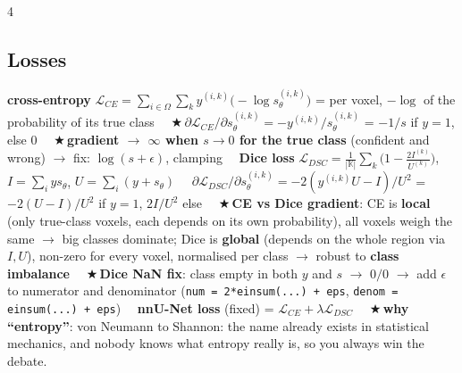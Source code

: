 \documentclass[a4paper]{article}
\newcommand{\K}[1]{\textcolor{kg}{\textbf{#1}}}
\newcommand{\F}[1]{\textcolor{fb}{#1}}
\newcommand{\E}[1]{\textcolor{ep}{#1}}
\newcommand{\T}[1]{\textcolor{tr}{\textbf{#1}}}
\newcommand{\X}{\textcolor{tr}{$\bigstar$}\,}
\newcommand{\D}{\unskip\ \textbf{\textbullet}\ \ignorespaces}
\newcommand{\ra}{\ensuremath{\to}}
\newcommand{\Om}{\Omega}
\begin{document}
\begin{multicols*}{4}
\subsection{Losses}
\K{cross-entropy} \F{$\mathcal L_{CE}=\sum_{i\in\Om}\sum_k y^{(i,k)}\big(-\log s_\theta^{(i,k)}\big)$} = per voxel, $-\log$ of the probability of its true class \D \X\F{$\partial\mathcal L_{CE}/\partial s_\theta^{(i,k)}=-y^{(i,k)}/s_\theta^{(i,k)}$} = $-1/s$ if $y{=}1$, else 0 \D \X\T{gradient \ra{} $\infty$ when $s\to0$ for the true class} (confident and wrong) \ra{} fix: $\log(s+\epsilon)$, clamping \D \K{Dice loss} \F{$\mathcal L_{DSC}=\frac1{|\mathbb K|}\sum_k\big(1-\frac{2I^{(k)}}{U^{(k)}}\big)$}, \F{$I=\sum_i ys_\theta$}, \F{$U=\sum_i(y+s_\theta)$} \D \F{$\partial\mathcal L_{DSC}/\partial s_\theta^{(i,k)}=-2(y^{(i,k)}U-I)/U^2$} = \F{$-2(U-I)/U^2$} if $y{=}1$, \F{$2I/U^2$} else \D \X\K{CE vs Dice gradient}: CE is \K{local} (only true-class voxels, each depends on its own probability), all voxels weigh the same \ra{} big classes dominate; Dice is \K{global} (depends on the whole region via $I,U$), non-zero for every voxel, normalised per class \ra{} robust to \K{class imbalance} \D \X\K{Dice NaN fix}: class empty in both $y$ and $s$ \ra{} $0/0$ \ra{} add $\epsilon$ to numerator and denominator (\E{\texttt{num = 2*einsum(...) + eps}, \texttt{denom = einsum(...) + eps}}) \D \K{nnU-Net loss} (fixed) = \F{$\mathcal L_{CE}+\lambda\mathcal L_{DSC}$} \D \X\K{why ``entropy''}: von Neumann to Shannon: the name already exists in statistical mechanics, and \E{nobody knows what entropy really is, so you always win the debate}.


\end{multicols*}
\end{document}
